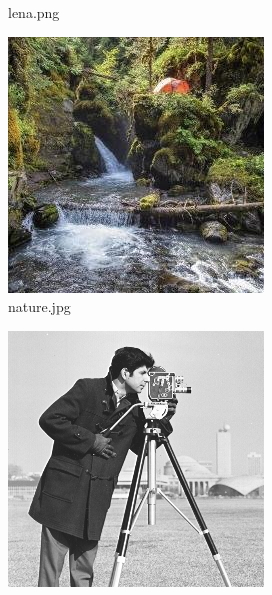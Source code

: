 \documentclass{l4proj}
\begin{document}
\begin{appendices}
\begin{figure}[!h]
\begin{subfigure}[b]{0.3\textwidth}
        \caption{lena.png}
        \label{lena.png}
    \end{subfigure}
    \begin{subfigure}[b]{0.3\textwidth}
        \includegraphics[width=\textwidth]{images/nature.jpg}
        \caption{nature.jpg}
        \label{nature.jpg}
    \end{subfigure}
    \begin{subfigure}[b]{0.3\textwidth}
        \includegraphics[width=\textwidth]{images/secret.png}

\end{subfigure}
\end{figure}
\end{appendices}
\end{document}
